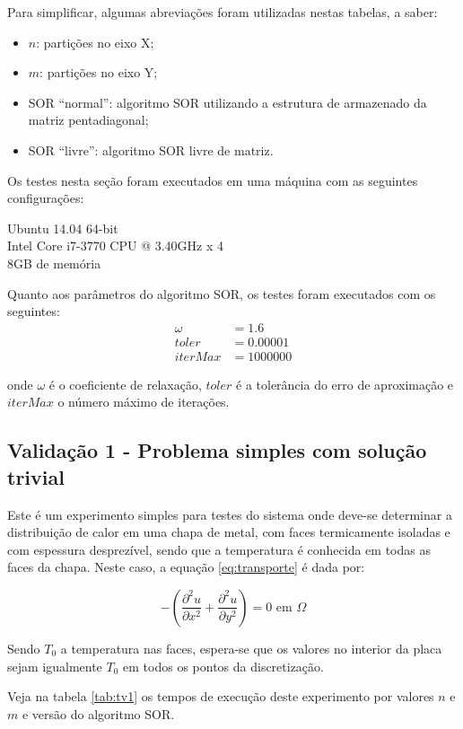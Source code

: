\documentclass[
	11pt,				%
	oneside,			%
	a4paper,			%
	english,			%
	brazil,				%
	]{article}
\begin{document}
Para simplificar, algumas abreviações foram utilizadas nestas tabelas, a saber:
\begin{itemize}
 \item $n$: partições no eixo X;
 \item $m$: partições no eixo Y;
 \item SOR ``normal'': algoritmo SOR utilizando a estrutura de
 armazenado da matriz pentadiagonal;
 \item SOR ``livre'': algoritmo SOR livre de matriz.
\end{itemize}

Os testes nesta seção foram executados em uma máquina com as seguintes 
configurações:

Ubuntu 14.04 64-bit \\
\indent Intel Core i7-3770 CPU @ 3.40GHz x 4 \\
\indent 8GB de memória

Quanto aos parâmetros do algoritmo SOR, os testes foram executados com os 
seguintes:
\begin{align*}
\omega &= 1.6 \\
toler &= 0.00001 \\
iterMax &= 1000000 
\end{align*}

\noindent onde $\omega$ é o coeficiente de relaxação, $toler$ é a tolerância do 
erro de aproximação e $iterMax$ o número máximo de iterações.

\subsection{Validação 1 - Problema simples com solução trivial}
Este é um experimento simples para testes do sistema onde deve-se determinar a 
distribuição de calor em uma chapa de metal, com faces termicamente isoladas e 
com espessura desprezível, sendo que a temperatura é conhecida em todas as 
faces da chapa. Neste caso, a equação \eqref{eq:transporte} é dada por:

\begin{equation} \label{eq:v1}
- \left(\frac{\partial^2 u}{\partial x^2} + \frac{\partial^2 u}{\partial 
y^2}\right) = 0 \text{ em } \Omega
\end{equation}

Sendo $T_0$ a temperatura nas faces, espera-se que os valores no interior da 
placa sejam igualmente $T_0$ em todos os pontos da discretização.

Veja na tabela \ref{tab:tv1} os tempos de execução deste experimento por 
valores $n$ e $m$ e versão do algoritmo SOR.
\end{document}
